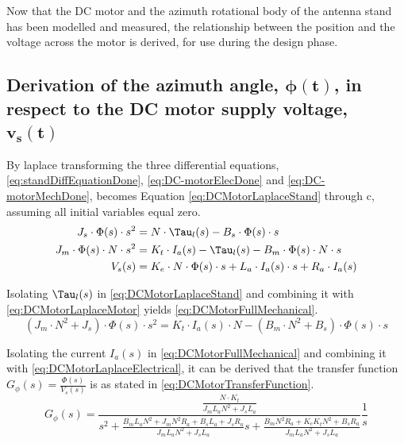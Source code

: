 Now that the DC motor and the azimuth rotational body of the antenna stand has been modelled and measured, the relationship between the position and the voltage across the motor is derived, for use during the design phase.

\subsection{Derivation of the azimuth angle, $\boldsymbol{\phi (t)}$, in respect to the DC motor supply voltage, $\boldsymbol{v_s(t)}$}\label{sec:techAnalTransferFunction}
By laplace transforming the three differential equations, \autoref{eq:standDiffEquationDone}, \autoref{eq:DC-motorElecDone} and \autoref{eq:DC-motorMechDone}, becomes Equation \ref{eq:DCMotorLaplaceStand} through c, assuming all initial variables equal zero.
\begin{subequations}
	\begin{align}
J_s\cdot \Phi (s)\cdot s^2&= N \cdot \Tau_l(s)-B_s \cdot \Phi (s) \cdot  s \label{eq:DCMotorLaplaceStand}\\
J_m\cdot \Phi (s)\cdot N\cdot s^2&=K_t \cdot I_a(s) - \Tau_l(s)-B_m \cdot \Phi (s)\cdot N \cdot  s  \label{eq:DCMotorLaplaceMotor}\\
V_s(s)&= K_e\cdot N \cdot \Phi (s)\cdot s + L_a\cdot I_a(s)\cdot s + R_a\cdot I_a(s) \label{eq:DCMotorLaplaceElectrical}
	\end{align}
\end{subequations}

Isolating $\Tau_l(s)$ in \autoref{eq:DCMotorLaplaceStand} and combining it with \autoref{eq:DCMotorLaplaceMotor} yields \autoref{eq:DCMotorFullMechanical}.
\begin{equation} 
\left( J_m\cdot N^2 + J_s\right)\cdot \Phi (s)\cdot s^2 = K_t\cdot I_a(s)\cdot N -\left( B_m\cdot N^2 +B_s \right)\cdot \Phi (s)\cdot s \label{eq:DCMotorFullMechanical}
\end{equation}

Isolating the current $I_a(s)$ in \autoref{eq:DCMotorFullMechanical} and combining it with \autoref{eq:DCMotorLaplaceElectrical}, it can be derived that the transfer function $G_{\phi} (s)=\frac{\Phi (s)}{V_s(s)}$ is as stated in  \autoref{eq:DCMotorTransferFunction}.
\begin{equation} 
G_{\phi} (s)=\frac{\frac{N\cdot K_t}{J_m L_a N^2 + J_s L_a}}{s^2+ \frac{B_m L_a N^2 + J_m N^2 R_a + B_s L_a + J_s R_a}{J_m L_a N^2 +J_s L_a} s + \frac{B_m N^2 R_a + K_e K_t N^2 + B_s R_a}{J_m L_a N^2 +J_s L_a}} \frac{1}{s}\label{eq:DCMotorTransferFunction}
\end{equation}

